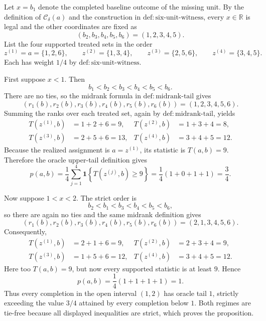 Let \(x=b_1\) denote the completed baseline outcome of the missing unit.  By the definition of \(\mathcal C_\delta(a)\) and the construction in \(\mathrm{def:six\mbox{-}unit\mbox{-}witness}\), every \(x\in\mathbb R\) is legal and the other coordinates are fixed as
\[
(b_2,b_3,b_4,b_5,b_6)=(1,2,3,4,5).
\]
List the four supported treated sets in the order
\[
z^{(1)}=a=\{1,2,6\},\qquad z^{(2)}=\{1,3,4\},\qquad z^{(3)}=\{2,5,6\},\qquad z^{(4)}=\{3,4,5\}.
\]
Each has weight \(1/4\) by \(\mathrm{def:six\mbox{-}unit\mbox{-}witness}\).

First suppose \(x<1\).  Then
\[
b_1<b_2<b_3<b_4<b_5<b_6.
\]
There are no ties, so the midrank formula in \(\mathrm{def:midrank\mbox{-}tail}\) gives
\[
(r_1(b),r_2(b),r_3(b),r_4(b),r_5(b),r_6(b))=(1,2,3,4,5,6).
\]
Summing the ranks over each treated set, again by \(\mathrm{def:midrank\mbox{-}tail}\), yields
\[
\begin{aligned}
T(z^{(1)},b)&=1+2+6=9, &
T(z^{(2)},b)&=1+3+4=8,\\
T(z^{(3)},b)&=2+5+6=13, &
T(z^{(4)},b)&=3+4+5=12.
\end{aligned}
\]
Because the realized assignment is \(a=z^{(1)}\), its statistic is \(T(a,b)=9\).  Therefore the oracle upper-tail definition gives
\[
p(a,b)=\frac14\sum_{j=1}^4\mathbf 1\!\left\{T(z^{(j)},b)\ge 9\right\}
=\frac14(1+0+1+1)=\frac34.
\]

Now suppose \(1<x<2\).  The strict order is
\[
b_2<b_1<b_3<b_4<b_5<b_6,
\]
so there are again no ties and the same midrank definition gives
\[
(r_1(b),r_2(b),r_3(b),r_4(b),r_5(b),r_6(b))=(2,1,3,4,5,6).
\]
Consequently,
\[
\begin{aligned}
T(z^{(1)},b)&=2+1+6=9, &
T(z^{(2)},b)&=2+3+4=9,\\
T(z^{(3)},b)&=1+5+6=12, &
T(z^{(4)},b)&=3+4+5=12.
\end{aligned}
\]
Here too \(T(a,b)=9\), but now every supported statistic is at least \(9\).  Hence
\[
p(a,b)=\frac14(1+1+1+1)=1.
\]
Thus every completion in the open interval \((1,2)\) has oracle tail \(1\), strictly exceeding the value \(3/4\) attained by every completion below \(1\).  Both regimes are tie-free because all displayed inequalities are strict, which proves the proposition.
